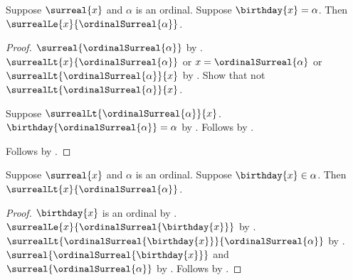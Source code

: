 \begin{lemma}\label{ordinal_surreal_maximum_at_birthday}
    Suppose $\surreal{x}$ and $\alpha$ is an ordinal.
    Suppose $\birthday{x}=\alpha$.
    Then $\surrealLe{x}{\ordinalSurreal{\alpha}}$.
\end{lemma}
\begin{proof}
    $\surreal{\ordinalSurreal{\alpha}}$
        by .
    $\surrealLt{x}{\ordinalSurreal{\alpha}}$ or
        $x=\ordinalSurreal{\alpha}$ or
        $\surrealLt{\ordinalSurreal{\alpha}}{x}$
        by .
    Show that not $\surrealLt{\ordinalSurreal{\alpha}}{x}$.
    \begin{subproof}
        Suppose $\surrealLt{\ordinalSurreal{\alpha}}{x}$.
        $\birthday{\ordinalSurreal{\alpha}}=\alpha$
            by .
        Follows by .
    \end{subproof}
    Follows by .
\end{proof}

\begin{lemma}\label{ordinal_surreal_strictly_dominates_birthday}
    Suppose $\surreal{x}$ and $\alpha$ is an ordinal.
    Suppose $\birthday{x}\in\alpha$.
    Then $\surrealLt{x}{\ordinalSurreal{\alpha}}$.
\end{lemma}
\begin{proof}
    $\birthday{x}$ is an ordinal
        by .
    $\surrealLe{x}{\ordinalSurreal{\birthday{x}}}$
        by .
    $\surrealLt{\ordinalSurreal{\birthday{x}}}
        {\ordinalSurreal{\alpha}}$
        by .
    $\surreal{\ordinalSurreal{\birthday{x}}}$ and
        $\surreal{\ordinalSurreal{\alpha}}$
        by .
    Follows by .
\end{proof}

